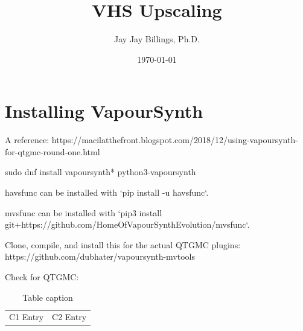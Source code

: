 \documentclass{article}
\title{VHS Upscaling}
\author{Jay Jay Billings, Ph.D.}
\date{\today}
\begin{document}
\maketitle

\section*{Installing VapourSynth}

A reference: https://macilatthefront.blogspot.com/2018/12/using-vapoursynth-for-qtgmc-round-one.html

sudo dnf install vapoursynth* python3-vapoursynth

havsfunc can be installed with `pip install -u havsfunc`.

mvsfunc can be installed with `pip3 install git+https://github.com/HomeOfVapourSynthEvolution/mvsfunc`.


Clone, compile, and install this for the actual QTGMC plugins: https://github.com/dubhater/vapoursynth-mvtools


Check for QTGMC:





\begin{table}[h!]
\centering
\begin{tabularx}{ 0.8\textwidth }{ | >{\raggedright\arraybackslash}X | >{\centering\arraybackslash}X | }
 \hline
 \multicolumn{2}{|c|}{Table title} \\
 \hline
 C1 Entry & C2 Entry \\
 \hline
\end{tabularx}
\caption{Table caption}
\end{table}
\end{document}
